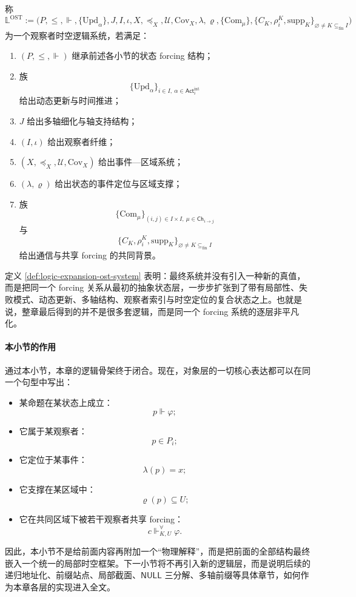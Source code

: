 \begin{definition}[观察者时空逻辑系统]\label{def:logic-expansion-ost-system}
称
\[
\mathbb{L}^{\mathrm{OST}}
:=
\bigl(
P,\le,\Vdash,\{\mathrm{Upd}_\alpha\},J,I,\iota,
X,\preceq_X,\mathcal U,\mathrm{Cov}_X,
\lambda,\varrho,\{\mathrm{Com}_\mu\},
\{C_K,\rho_i^K,\mathrm{supp}_K\}_{\varnothing\neq K\subseteq_{\mathrm{fin}} I}
\bigr)
\]
为一个观察者时空逻辑系统，若满足：
\begin{enumerate}
  \item \((P,\le,\Vdash)\) 继承前述各小节的状态 forcing 结构；
  \item 族
  \[
  \{\mathrm{Upd}_\alpha\}_{i\in I,\ \alpha\in \mathsf{Act}_i^{\mathrm{int}}}
  \]
  给出动态更新与时间推进；
  \item \(J\) 给出多轴细化与轴支持结构；
  \item \((I,\iota)\) 给出观察者纤维；
  \item \((X,\preceq_X,\mathcal U,\mathrm{Cov}_X)\) 给出事件—区域系统；
  \item \((\lambda,\varrho)\) 给出状态的事件定位与区域支撑；
  \item 族
  \[
  \{\mathrm{Com}_\mu\}_{(i,j)\in I\times I,\ \mu\in \mathsf{Ch}_{i\to j}}
  \]
  与
  \[
  \{C_K,\rho_i^K,\mathrm{supp}_K\}_{\varnothing\neq K\subseteq_{\mathrm{fin}} I}
  \]
  给出通信与共享 forcing 的共同背景。
\end{enumerate}
\end{definition}

定义 \ref{def:logic-expansion-ost-system} 表明：最终系统并没有引入一种新的真值，而是把同一个 forcing 关系从最初的抽象状态层，一步步扩张到了带有局部性、失败模式、动态更新、多轴结构、观察者索引与时空定位的复合状态之上。也就是说，整章最后得到的并不是很多套逻辑，而是同一个 forcing 系统的逐层非平凡化。

\paragraph{本小节的作用}
通过本小节，本章的逻辑骨架终于闭合。现在，对象层的一切核心表达都可以在同一个句型中写出：
\begin{itemize}
  \item 某命题在某状态上成立：
  \[
  p\Vdash \varphi;
  \]
  \item 它属于某观察者：
  \[
  p\in P_i;
  \]
  \item 它定位于某事件：
  \[
  \lambda(p)=x;
  \]
  \item 它支撑在某区域中：
  \[
  \varrho(p)\subseteq U;
  \]
  \item 它在共同区域下被若干观察者共享 forcing：
  \[
  c\Vdash^{\forall}_{K,U}\varphi.
  \]
\end{itemize}

因此，本小节不是给前面内容再附加一个“物理解释”，而是把前面的全部结构最终嵌入一个统一的局部时空框架。下一小节将不再引入新的逻辑层，而是说明后续的递归地址化、前缀站点、局部截面、\(\mathsf{NULL}\) 三分解、多轴前缀等具体章节，如何作为本章各层的实现进入全文。
